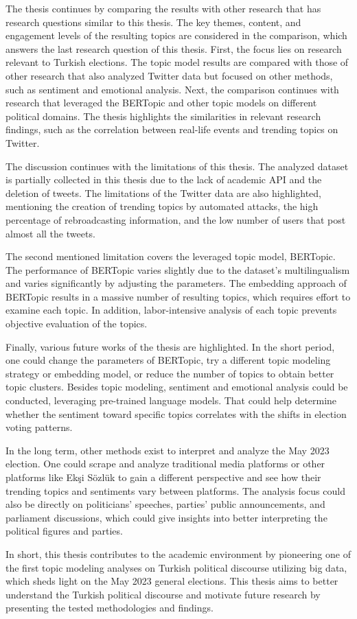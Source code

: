 The thesis continues by comparing the results with other research that has research questions similar 
to this thesis. The key themes, content, and engagement levels of the resulting topics are considered 
in the comparison, which answers the last research question of this thesis.
First, the focus lies on research relevant to Turkish elections. The topic model results are compared 
with those of other research that also analyzed Twitter data but focused on other methods, such as 
sentiment and emotional analysis. 
Next, the comparison continues with research that leveraged the BERTopic and other topic models on 
different political domains. The thesis highlights the similarities in relevant research findings, 
such as the correlation between real-life events and trending topics on Twitter.

The discussion continues with the limitations of this thesis. The analyzed dataset is partially 
collected in this thesis due to the lack of academic API and the deletion of tweets. The limitations 
of the Twitter data are also highlighted, mentioning the creation of trending topics by automated 
attacks, the high percentage of rebroadcasting information, and the low number of users that post 
almost all the tweets.

The second mentioned limitation covers the leveraged topic model, BERTopic. The performance of 
BERTopic varies slightly due to the dataset's multilingualism and varies significantly by adjusting 
the parameters. The embedding approach of BERTopic results in a massive number of resulting topics, 
which requires effort to examine each topic. In addition, labor-intensive analysis of each topic 
prevents objective evaluation of the topics.

Finally, various future works of the thesis are highlighted. In the short period, one could change 
the parameters of BERTopic, try a different topic modeling strategy or embedding model, or reduce 
the number of topics to obtain better topic clusters. Besides topic modeling, sentiment and emotional 
analysis could be conducted, leveraging pre-trained language models. That could help determine 
whether the sentiment toward specific topics correlates with the shifts in election voting patterns.

In the long term, other methods exist to interpret and analyze the May 2023 election. One could 
scrape and analyze traditional media platforms or other platforms like Ekşi Sözlük to gain a different 
perspective and see how their trending topics and sentiments vary between platforms. 
The analysis focus could also be directly on politicians' speeches, parties' public announcements, 
and parliament discussions, which could give insights into better interpreting the political figures 
and parties.

In short, this thesis contributes to the academic environment by pioneering one of the first 
topic modeling analyses on Turkish political discourse utilizing big data, which sheds light on 
the May 2023 general elections. This thesis aims to better understand the Turkish political discourse 
and motivate future research by presenting the tested methodologies and findings.